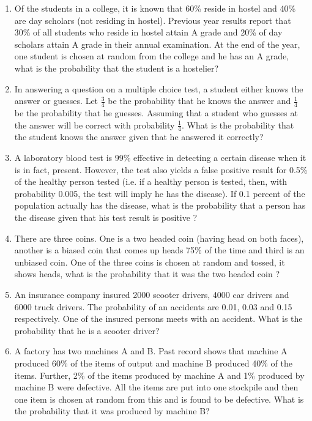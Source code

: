 \begin{enumerate}[label=\thesubsection.\arabic*,ref=\thesubsection.\theenumi]
		\label{ncert/12/13/3/2}
\item Of the students in a college, it is known that 60\% reside in hostel and 40\% are
day scholars (not residing in hostel). Previous year results report that 30\% of all
students who reside in hostel attain A grade and 20\% of day scholars attain A
grade in their annual examination. At the end of the year, one student is chosen
at random from the college and he has an A grade, what is the probability that the
student is a hostelier?     
		\label{ncert/12/13/3/3}
\\
\solution

\item In answering a question on a multiple choice test, a student either knows the
answer or guesses. Let
$\frac{3}{4}$ be the probability that he knows the answer and
$\frac{1}{4}$
be the probability that he guesses. Assuming that a student who guesses at the
answer will be correct with probability
$\frac{1}{4}$. What is the probability that the student knows the answer given that he answered it correctly?
\\
\solution

\item A laboratory blood test is 99\% effective in detecting a certain disease when it is
in fact, present. However, the test also yields a false positive result for 0.5\% of
the healthy person tested (i.e. if a healthy person is tested, then, with probability
0.005, the test will imply he has the disease). If 0.1 percent of the population
actually has the disease, what is the probability that a person has the disease
given that his test result is positive ?
\\
\solution

\item There are three coins. One is a two headed coin (having head on both faces),
another is a biased coin that comes up heads 75\% of the time and third is an
unbiased coin. One of the three coins is chosen at random and tossed, it shows
heads, what is the probability that it was the two headed coin ?
\\
\solution
%

\item An insurance company insured 2000 scooter drivers, 4000 car drivers and 6000
truck drivers. The probability of an accidents are 0.01, 0.03 and 0.15 respectively.
One of the insured persons meets with an accident. What is the probability that
he is a scooter driver?
\item A factory has two machines A and B. Past record shows that machine A produced
60\% of the items of output and machine B produced 40\% of the items. Further,
2\% of the items produced by machine A and 1\% produced by machine B were
defective. All the items are put into one stockpile and then one item is chosen at
random from this and is found to be defective. What is the probability that it was
produced by machine B?


\end{enumerate}
